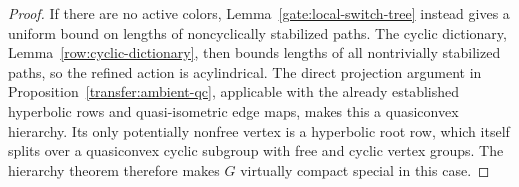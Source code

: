 \begin{proof}
If there are no active colors, Lemma~\ref{gate:local-switch-tree} instead
gives a uniform bound on lengths of noncyclically stabilized paths.
The cyclic dictionary, Lemma~\ref{row:cyclic-dictionary}, then bounds
lengths of all nontrivially stabilized paths, so the refined action is
acylindrical.  The direct projection argument in
Proposition~\ref{transfer:ambient-qc}, applicable with the already established
hyperbolic rows and quasi-isometric edge maps, makes this a quasiconvex
hierarchy.  Its only potentially nonfree vertex is a hyperbolic root row,
which itself splits over a quasiconvex cyclic subgroup with free and
cyclic vertex groups.  The hierarchy theorem therefore makes $G$
virtually compact special in this case.
\end{proof}
